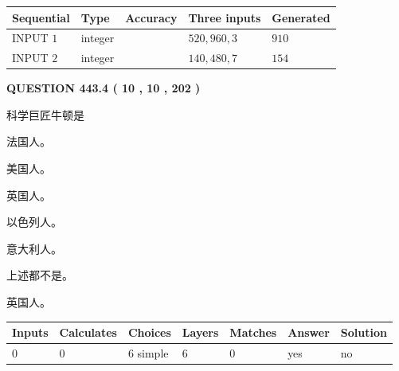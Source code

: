 \documentclass{ctexart}
\begin{document}
   
  
  
\noindent\begin{tabular}{|l|l|l|l|l|}
\hline
 Sequential & Type & Accuracy & Three inputs & Generated \\ 
\hline
 
 
  INPUT $  1 $ & integer &  & $
 520
 , 
 960
 , 
 3
 $ & $ 910 $ 
 \\  \hline  
 
 
  INPUT $  2 $ & integer &  & $
 140
 , 
 480
 , 
 7
 $ & $ 154 $ 
 \\  \hline  
 \end{tabular}
   
   
  
\vspace{0.2in}
  
{\textbf{\Large{QUESTION
443.4 
 ( 10 , 10 , 202 )
}}}
  
  
科学巨匠牛顿是
 
 
法国人。
 
 
美国人。
 
 
英国人。
 
 
以色列人。
 
 
意大利人。
 
 
 上述都不是。
 
 
\noindent{}
 
 
英国人。
 
 
\noindent{}
 
 
   
   
   
   
\noindent\begin{tabular}{|l|l|l|l|l|l|l|}
 \hline
Inputs & Calculates & Choices & Layers & Matches & Answer & Solution \\ \hline
 0  & 
 0  & 
 6
  simple  
  & 
 6  & 
 0  & 
  yes & 
  no 
  \\ \hline
 \end{tabular}
   
   
   
   
\noindent{}
   
\end{document}
